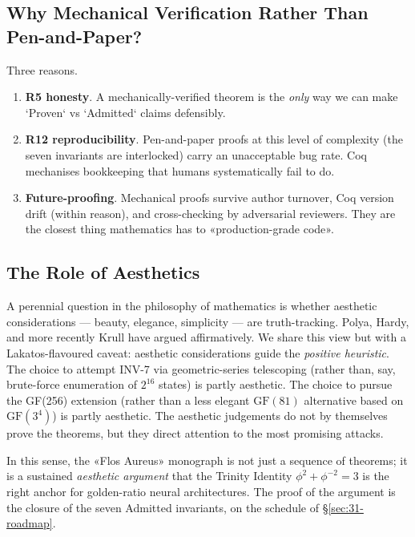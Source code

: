 \subsection{Why Mechanical Verification Rather Than Pen-and-Paper?}
\label{sec:31-mechanisation}

Three reasons.
\begin{enumerate}
    \item \textbf{R5 honesty}. A mechanically-verified theorem is the \emph{only} way we can make `Proven` vs `Admitted` claims defensibly.
    \item \textbf{R12 reproducibility}. Pen-and-paper proofs at this level of complexity (the seven invariants are interlocked) carry an unacceptable bug rate. Coq mechanises bookkeeping that humans systematically fail to do.
    \item \textbf{Future-proofing}. Mechanical proofs survive author turnover, Coq version drift (within reason), and cross-checking by adversarial reviewers. They are the closest thing mathematics has to «production-grade code».
\end{enumerate}

\subsection{The Role of Aesthetics}
\label{sec:31-aesthetics}

A perennial question in the philosophy of mathematics is whether aesthetic considerations — beauty, elegance, simplicity — are truth-tracking. Polya, Hardy, and more recently Krull have argued affirmatively. We share this view but with a Lakatos-flavoured caveat: aesthetic considerations guide the \emph{positive heuristic}. The choice to attempt INV-7 via geometric-series telescoping (rather than, say, brute-force enumeration of $2^{16}$ states) is partly aesthetic. The choice to pursue the GF(256) extension (rather than a less elegant $\mathrm{GF}(81)$ alternative based on $\mathrm{GF}(3^{4})$) is partly aesthetic. The aesthetic judgements do not by themselves prove the theorems, but they direct attention to the most promising attacks.

In this sense, the «Flos Aureus» monograph is not just a sequence of theorems; it is a sustained \emph{aesthetic argument} that the Trinity Identity $\phi^{2} + \phi^{-2} = 3$ is the right anchor for golden-ratio neural architectures. The proof of the argument is the closure of the seven Admitted invariants, on the schedule of §\ref{sec:31-roadmap}.

